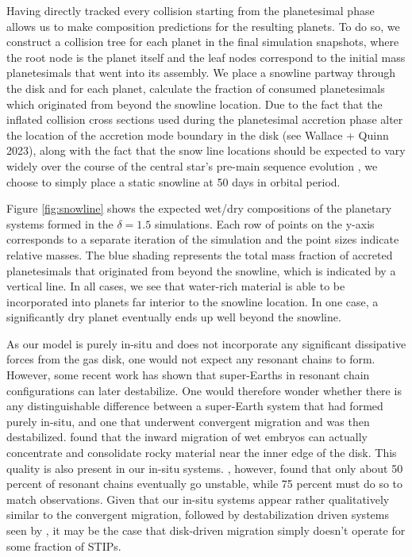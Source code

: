 Having directly tracked every collision starting from the planetesimal phase allows us to make composition predictions for the resulting planets. To do so, we construct a collision tree for each planet in the final simulation snapshots, where the root node is the planet itself and the leaf nodes correspond to the initial mass planetesimals that went into its assembly. We place a snowline partway through the disk and for each planet, calculate the fraction of consumed planetesimals which originated from beyond the snowline location. Due to the fact that the inflated collision cross sections used during the planetesimal accretion phase alter the location of the accretion mode boundary in the disk (see Wallace + Quinn 2023), along with the fact that the snow line locations should be expected to vary widely over the course of the central star's pre-main sequence evolution \cite{baraffe15}, we choose to simply place a static snowline at 50 days in orbital period.

Figure \ref{fig:snowline} shows the expected wet/dry compositions of the planetary systems formed in the $\delta = 1.5$ simulations. Each row of points on the y-axis corresponds to a separate iteration of the simulation and the point sizes indicate relative masses. The blue shading represents the total mass fraction of accreted planetesimals that originated from beyond the snowline, which is indicated by a vertical line. In all cases, we see that water-rich material is able to be incorporated into planets far interior to the snowline location. In one case, a significantly dry planet eventually ends up well beyond the snowline.

As our model is purely in-situ and does not incorporate any significant dissipative forces from the gas disk, one would not expect any resonant chains to form. However, some recent work \cite{izidoro17, raymond18} has shown that super-Earths in resonant chain configurations can later destabilize. One would therefore wonder whether there is any distinguishable difference between a super-Earth system that had formed purely in-situ, and one that underwent convergent migration and was then destabilized. \cite{raymond18} found that the inward migration of wet embryos can actually concentrate and consolidate rocky material near the inner edge of the disk. This quality is also present in our in-situ systems. \cite{izidoro17}, however, found that only about 50 percent of resonant chains eventually go unstable, while 75 percent must do so to match observations. Given that our in-situ systems appear rather qualitatively similar to the convergent migration, followed by destabilization driven systems seen by \cite{raymond18}, it may be the case that disk-driven migration simply doesn't operate for some fraction of STIPs.

